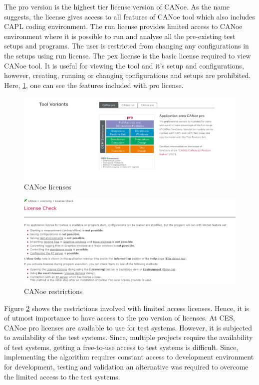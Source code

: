 The pro version is the highest tier license version of CANoe. As the name suggests, the license gives access to all features of CANoe tool which also includes CAPL coding environment. The run license provides limited access to CANoe environment where it is possible to run and analyse all the pre-existing test setups and programs. The user is restricted from changing any configurations in the setups using run license. The pex license is the basic license required to view CANoe tool. It is useful for viewing the tool and it's setup and configurations, however, creating, running or changing configurations and setups are prohibited. Here, \ref{fig:CANoe Licenses}, one can see the features included with pro license.

\begin{figure}[h]
    	\centering
    	\includegraphics[width= 1\textwidth]{images/CANoe license type.png}
    	\caption [Licenses]{CANoe licenses}  
    	\label{fig:CANoe Licenses}
\end{figure}

\begin{figure}[h]
    	\centering
    	\includegraphics[width= 1\textwidth]{images/CANoe license restrictions.png}
    	\caption [Restrictions]{CANoe restrictions}  
    	\label{fig:CANoe Restrictions}
\end{figure}


\clearpage

Figure \ref{fig:CANoe Restrictions} shows the restrictions involved with limited access licenses. Hence, it is of utmost importance to have access to the pro version of licenses. At CES, CANoe pro licenses are available to use for test systems. However, it is subjected to availability of the test systems. Since, multiple projects require the availability of test systems, getting a free-to-use access to test systems is difficult. Since, implementing the algorithm requires constant access to development environment for development, testing and validation an alternative was required to overcome the limited access to the test systems. 

